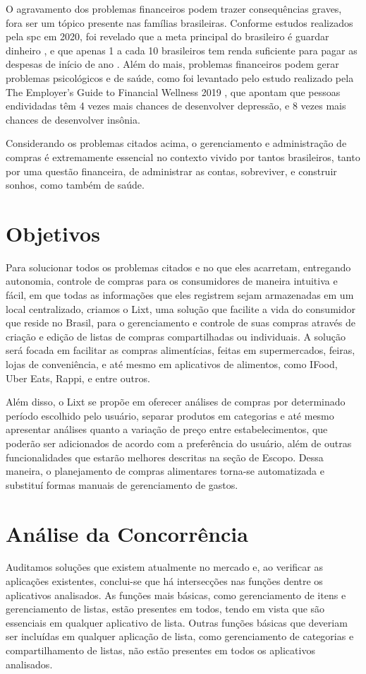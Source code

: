 O agravamento dos problemas financeiros podem trazer consequências graves, fora ser um tópico presente nas famílias brasileiras. Conforme estudos realizados pela \gls{spc} em 2020, foi revelado que a meta principal do brasileiro é guardar dinheiro \cite{MetaFinanceiraSPC}, e que apenas 1 a cada 10 brasileiros tem renda suficiente para pagar as despesas de início de ano \cite{DespesaSPC}. Além do mais, problemas financeiros podem gerar problemas psicológicos e de saúde, como foi levantado pelo estudo realizado pela The Employer’s Guide to Financial Wellness 2019 \cite{Endividados}, que apontam que pessoas endividadas têm 4 vezes mais chances de desenvolver depressão, e 8 vezes mais chances de desenvolver insônia.

Considerando os problemas citados acima, o gerenciamento e administração de compras é extremamente essencial no contexto vivido por tantos brasileiros, tanto por uma questão financeira, de administrar as contas, sobreviver, e construir sonhos, como também de saúde.

\label{sec:objetivos}
\section{Objetivos}
Para solucionar todos os problemas citados e no que eles acarretam, entregando autonomia, controle de compras para os consumidores de maneira intuitiva e fácil, em que todas as informações que eles registrem sejam armazenadas em um local centralizado, criamos o Lixt, uma solução que facilite a vida do consumidor que reside no Brasil, para o gerenciamento e controle de suas compras através de criação e edição de listas de compras compartilhadas ou individuais. A solução será focada em facilitar as compras alimentícias, feitas em supermercados, feiras, lojas de conveniência, e até mesmo em aplicativos de alimentos, como IFood, Uber Eats, Rappi, e entre outros.

Além disso, o Lixt se propõe em oferecer análises de compras por determinado período escolhido pelo usuário, separar produtos em categorias e até mesmo apresentar análises quanto a variação de preço entre estabelecimentos, que poderão ser adicionados de acordo com a preferência do usuário, além de outras funcionalidades que estarão melhores descritas na seção de Escopo. Dessa maneira, o planejamento de compras alimentares torna-se automatizada e substituí formas manuais de gerenciamento de gastos.

\label{sec:analiseconcorrencia}
\section{Análise da Concorrência}
Auditamos soluções que existem atualmente no mercado e, ao verificar as aplicações existentes, conclui-se que há intersecções nas funções dentre os aplicativos analisados. As funções mais básicas, como gerenciamento de itens e gerenciamento de listas, estão presentes em todos, tendo em vista que são essenciais em qualquer aplicativo de
lista. Outras funções básicas que deveriam ser incluídas em qualquer aplicação de lista, como gerenciamento de categorias e
compartilhamento de listas, não estão presentes em todos os
aplicativos analisados.

